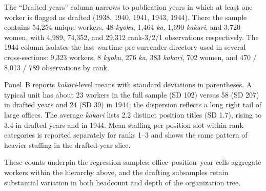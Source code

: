 The ``Drafted years'' column narrows to publication years in which at least one worker is flagged as drafted (1938, 1940, 1941, 1943, 1944). There the sample contains 54{,}254 unique workers, 48 \emph{kyoku}, 1{,}464 \emph{ka}, 1{,}690 \emph{kakari}, and 3{,}720 women, with 4{,}989, 74{,}352, and 29{,}312 rank-3/2/1 observations respectively. The 1944 column isolates the last wartime pre-surrender directory used in several cross-sections: 9{,}323 workers, 8 \emph{kyoku}, 276 \emph{ka}, 383 \emph{kakari}, 702 women, and 470 / 8{,}013 / 789 observations by rank.

Panel~B reports \emph{kakari}-level means with standard deviations in parentheses. A typical unit has about 23 workers in the full sample (SD 102) versus 58 (SD 207) in drafted years and 24 (SD 39) in 1944; the dispersion reflects a long right tail of large offices. The average \emph{kakari} lists 2.2 distinct position titles (SD 1.7), rising to 3.4 in drafted years and in 1944. Mean staffing per position slot within rank categories is reported separately for ranks 1--3 and shows the same pattern of heavier staffing in the drafted-year slice.

These counts underpin the regression samples: office--position--year cells aggregate workers within the hierarchy above, and the drafting subsamples retain substantial variation in both headcount and depth of the organization tree.
